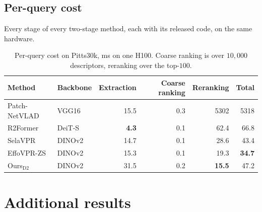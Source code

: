 \subsection{Per-query cost}
\label{app:cost}
Every stage of every two-stage method, each with its released code, on the same hardware.
\begin{table}[!htb]
\caption{Per-query cost on Pitts30k, ms on one H100. Coarse ranking is over $10{,}000$ descriptors, reranking over the top-$100$.}
\label{tab:s2cost}
\centering
{\footnotesize\setlength{\tabcolsep}{5pt}%
\begin{tabular}{llrrrr}
\toprule
Method & Backbone & Extraction & Coarse ranking & Reranking & Total \\
\midrule
Patch-NetVLAD & VGG16 & 15.5 & 0.3 & 5302 & 5318 \\
R2Former & DeiT-S & \textbf{4.3} & 0.1 & 62.4 & 66.8 \\
SelaVPR & DINOv2 & 14.7 & 0.1 & 28.6 & 43.4 \\
EffoVPR-ZS & DINOv2 & 15.3 & 0.1 & 19.3 & \textbf{34.7} \\
\midrule
Ours$_{\mathrm{D2}}$ & DINOv2 & 31.5 & 0.2 & \textbf{15.5} & 47.2 \\
\bottomrule
\end{tabular}%
}
\end{table}

\FloatBarrier

\section{Additional results}
